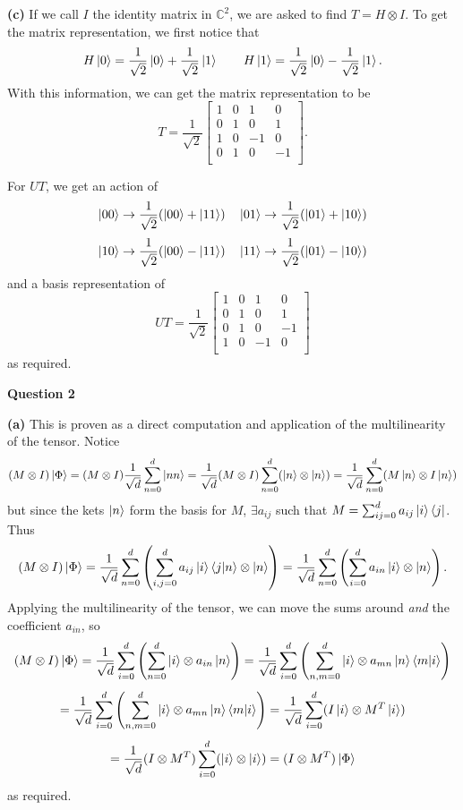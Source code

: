 \documentclass[10pt]{article}
\newcommand{\C}{\mathbb{C}}
\begin{document}
\textbf{(c)} If we call $I$ the identity matrix in $\C^{2}$, we are asked to find $T = H \otimes I$. To get the matrix representation, we first notice that
\[ H\ket{0} = \frac{1}{\sqrt{2}}\ket{0} + \frac{1}{\sqrt{2}}\ket{1} \hspace{2em} H\ket{1} = \frac{1}{\sqrt{2}}\ket{0} - \frac{1}{\sqrt{2}}\ket{1}.\]
With this information, we can get the matrix representation to be
\[ T = \frac{1}{\sqrt{2}}
\begin{bmatrix}
  1 & 0 & 1 & 0 \\
  0 & 1 & 0 & 1 \\
  1 & 0 & -1 & 0 \\
  0 & 1 & 0 & -1 \\
\end{bmatrix}.
\]

For $UT$, we get an action of
\[ \ket{00} \to \frac{1}{\sqrt{2}}(\ket{00}+\ket{11}) \hspace{1em} \ket{01} \to \frac{1}{\sqrt{2}}(\ket{01}+\ket{10}) \]
\[ \ket{10} \to \frac{1}{\sqrt{2}}(\ket{00}-\ket{11}) \hspace{1em} \ket{11} \to \frac{1}{\sqrt{2}}(\ket{01}-\ket{10})\]
and a basis representation of
\[ UT = \frac{1}{\sqrt{2}}
\begin{bmatrix}
  1 & 0 & 1 & 0 \\
  0 & 1 & 0 & 1 \\
  0 & 1 & 0 & -1 \\
  1 & 0 & -1 & 0 \\
\end{bmatrix}
\]
as required.

\newpage
\textbf{Question 2}

\textbf{(a)} This is proven as a direct computation and application of the multilinearity of the tensor. Notice
\[ (M\otimes I)\ket{\Phi} = (M\otimes I)\frac{1}{\sqrt{d}}\sum_{n=0}^{d}\ket{nn} = \frac{1}{\sqrt{d}}(M\otimes I)\sum_{n=0}^{d}(\ket{n}\otimes\ket{n}) = \frac{1}{\sqrt{d}}\sum_{n=0}^{d}(M\ket{n}\otimes I\ket{n})\]
but since the kets $\ket{n}$ form the basis for $M$, $\exists a_{ij}$ such that $M = \sum_{ij=0}^{d}a_{ij}\ket{i}\bra{j}$. Thus
\[ (M\otimes I)\ket{\Phi} = \frac{1}{\sqrt{d}}\sum_{n=0}^{d}\left(\sum_{i,j=0}^{d}a_{ij}\ket{i}\braket{j|n} \otimes \ket{n} \right) = \frac{1}{\sqrt{d}}\sum_{n=0}^{d}\left(\sum_{i=0}^{d}a_{in}\ket{i} \otimes \ket{n} \right).\]
Applying the multilinearity of the tensor, we can move the sums around \textit{and} the coefficient $a_{in}$, so
\[ (M\otimes I)\ket{\Phi} = \frac{1}{\sqrt{d}}\sum_{i=0}^{d}\left(\sum_{n=0}^{d}\ket{i} \otimes a_{in}\ket{n} \right) = \frac{1}{\sqrt{d}}\sum_{i=0}^{d}\left(\sum_{n,m=0}^{d}\ket{i} \otimes a_{mn}\ket{n}\braket{m|i} \right)\]
\[ = \frac{1}{\sqrt{d}}\sum_{i=0}^{d}\left(\sum_{n,m=0}^{d}\ket{i} \otimes a_{mn}\ket{n}\braket{m|i} \right) = \frac{1}{\sqrt{d}} \sum_{i=0}^{d}(I\ket{i} \otimes M^{T}\ket{i})\]
\[ = \frac{1}{\sqrt{d}}(I\otimes M^{T})\sum_{i=0}^{d}(\ket{i}\otimes\ket{i}) = (I\otimes M^{T})\ket{\Phi} \]
as required.
\end{document}
